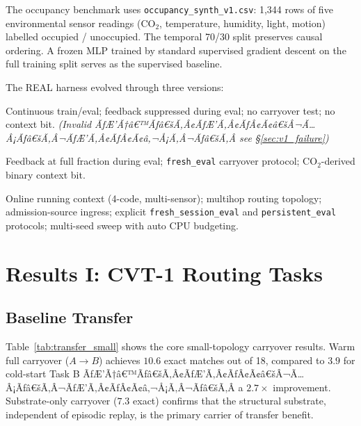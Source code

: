 \documentclass[10pt,twocolumn]{article}
\begin{document}
The occupancy benchmark uses \texttt{occupancy\_synth\_v1.csv}: 1,344 rows
of five environmental sensor readings (CO$_2$, temperature, humidity, light,
motion) labelled occupied / unoccupied.
The temporal 70/30 split preserves causal ordering.
A frozen MLP trained by standard supervised gradient descent on the full
training split serves as the supervised baseline.

The REAL harness evolved through three versions:

\begin{description}[leftmargin=1.2em, topsep=2pt]
  \item[V1] Continuous train/eval; feedback suppressed during eval;
            no carryover test; no context bit. \emph{(Invalid ÃƒÆ’Ã†â€™Ãƒâ€šÃ‚Â¢ÃƒÆ’Ã‚Â¢ÃƒÂ¢Ã¢â€šÂ¬Ã…Â¡Ãƒâ€šÃ‚Â¬ÃƒÆ’Ã‚Â¢ÃƒÂ¢Ã¢â‚¬Å¡Ã‚Â¬Ãƒâ€šÃ‚Â see \S\ref{sec:v1_failure})}
  \item[V2] Feedback at full fraction during eval; \texttt{fresh\_eval}
            carryover protocol; CO$_2$-derived binary context bit.
  \item[V3] Online running context (4-code, multi-sensor);
            multihop routing topology; admission-source ingress;
            explicit \texttt{fresh\_session\_eval} and \texttt{persistent\_eval}
            protocols; multi-seed sweep with auto CPU budgeting.
\end{description}

\section{Results I: CVT-1 Routing Tasks}
\label{sec:cvt1_results}

\subsection{Baseline Transfer}
\label{sec:baseline_transfer}

Table~\ref{tab:transfer_small} shows the core small-topology carryover results.
Warm full carryover ($A \to B$) achieves $10.6$ exact matches out of 18,
compared to $3.9$ for cold-start Task B ÃƒÆ’Ã†â€™Ãƒâ€šÃ‚Â¢ÃƒÆ’Ã‚Â¢ÃƒÂ¢Ã¢â€šÂ¬Ã…Â¡Ãƒâ€šÃ‚Â¬ÃƒÆ’Ã‚Â¢ÃƒÂ¢Ã¢â‚¬Å¡Ã‚Â¬Ãƒâ€šÃ‚Â a $2.7\times$ improvement.
Substrate-only carryover ($7.3$ exact) confirms that the structural substrate,
independent of episodic replay, is the primary carrier of transfer benefit.
\end{document}
